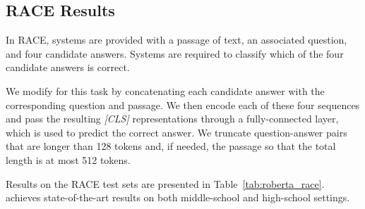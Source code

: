 \subsection{RACE Results} \label{sec:results_race}

In RACE, systems are provided with a passage of text, an associated question, and four candidate answers. Systems are required to classify which of the four candidate answers is correct.

We modify \ourmodel{} for this task by concatenating each candidate answer with the corresponding question and passage.
We then encode each of these four sequences and pass the resulting \emph{[CLS]} representations through a fully-connected layer, which is used to predict the correct answer.
We truncate question-answer pairs that are longer than 128 tokens and, if needed, the passage so that the total length is at most 512 tokens.




Results on the RACE test sets are presented in Table~\ref{tab:roberta_race}.
\ourmodel{} achieves state-of-the-art results on both middle-school and high-school settings.



